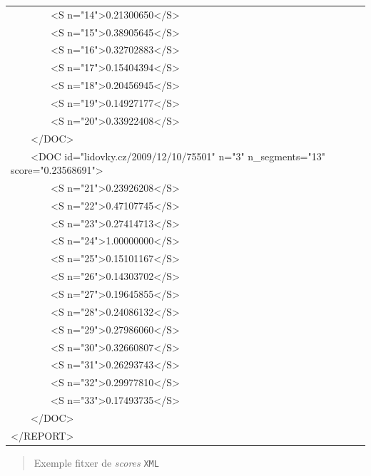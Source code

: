 \documentclass[11pt,a4paper]{article}
\begin{document}
\begin{table} [H]
{\begin{tabular}{l}
\ \ \ \ \ \ \ \ \textless S n="14"\textgreater0.21300650\textless/S\textgreater \\
\ \ \ \ \ \ \ \ \textless S n="15"\textgreater0.38905645\textless/S\textgreater \\
\ \ \ \ \ \ \ \ \textless S n="16"\textgreater0.32702883\textless/S\textgreater \\
\ \ \ \ \ \ \ \ \textless S n="17"\textgreater0.15404394\textless/S\textgreater \\
\ \ \ \ \ \ \ \ \textless S n="18"\textgreater0.20456945\textless/S\textgreater \\
\ \ \ \ \ \ \ \ \textless S n="19"\textgreater0.14927177\textless/S\textgreater \\
\ \ \ \ \ \ \ \ \textless S n="20"\textgreater0.33922408\textless/S\textgreater \\
\ \ \ \ \textless/DOC\textgreater \\
\ \ \ \ \textless DOC id="lidovky.cz/2009/12/10/75501" n="3" n\_segments="13" score="0.23568691"\textgreater \\
\ \ \ \ \ \ \ \ \textless S n="21"\textgreater0.23926208\textless/S\textgreater \\
\ \ \ \ \ \ \ \ \textless S n="22"\textgreater0.47107745\textless/S\textgreater \\
\ \ \ \ \ \ \ \ \textless S n="23"\textgreater0.27414713\textless/S\textgreater \\
\ \ \ \ \ \ \ \ \textless S n="24"\textgreater1.00000000\textless/S\textgreater \\
\ \ \ \ \ \ \ \ \textless S n="25"\textgreater0.15101167\textless/S\textgreater \\
\ \ \ \ \ \ \ \ \textless S n="26"\textgreater0.14303702\textless/S\textgreater \\
\ \ \ \ \ \ \ \ \textless S n="27"\textgreater0.19645855\textless/S\textgreater \\
\ \ \ \ \ \ \ \ \textless S n="28"\textgreater0.24086132\textless/S\textgreater \\
\ \ \ \ \ \ \ \ \textless S n="29"\textgreater0.27986060\textless/S\textgreater \\
\ \ \ \ \ \ \ \ \textless S n="30"\textgreater0.32660807\textless/S\textgreater \\
\ \ \ \ \ \ \ \ \textless S n="31"\textgreater0.26293743\textless/S\textgreater \\
\ \ \ \ \ \ \ \ \textless S n="32"\textgreater0.29977810\textless/S\textgreater \\
\ \ \ \ \ \ \ \ \textless S n="33"\textgreater0.17493735\textless/S\textgreater \\
\ \ \ \ \textless/DOC\textgreater \\
\textless/REPORT\textgreater \\
\hline
\end{tabular} }
\begin{quote}
\centering
Exemple fitxer de \textit{scores} \texttt{XML}
\end{quote}
\end{table}
\end{document}
